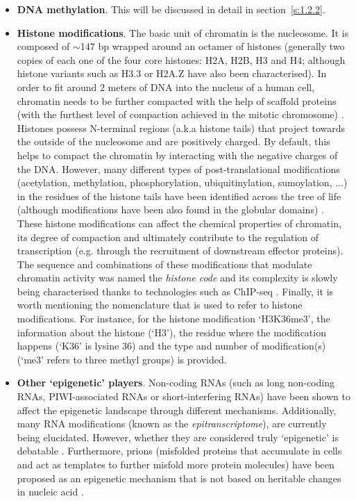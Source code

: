 \begin{itemize}
	
	\item \textbf{DNA methylation}. This will be discussed in detail in section~\ref{s:1.2.2}.
	
	\item \textbf{Histone modifications}. The basic unit of chromatin is the nucleosome. It is composed of $\sim$147 \acrshort{bp} wrapped around an octamer of histones (generally two copies of each one of the four core histones: H2A, H2B, H3 and H4; although histone variants such as H3.3 or H2A.Z have also been characterised). In order to fit around 2 meters of DNA into the nucleus of a human cell, chromatin needs to be further compacted with the help of scaffold proteins (with the furthest level of compaction achieved in the mitotic chromosome) \cite{Ou2017}. Histones possess N-terminal regions (a.k.a histone tails) that project towards the outside of the nucleosome and are positively charged. By default, this helps to compact the chromatin by interacting with the negative charges of the DNA. However, many different types of post-translational modifications (acetylation, methylation, phosphorylation, ubiquitinylation, sumoylation, ...) in the residues of the histone tails have been identified across the tree of life (although modifications have been also found in the globular domains) \cite{Lawrence2016}. These histone modifications can affect the chemical properties of chromatin, its degree of compaction and ultimately contribute to the regulation of transcription (e.g. through the recruitment of downstream effector proteins). The sequence and combinations of these modifications that modulate chromatin activity was named the \textit{histone code} \cite{Strahl2000} and its complexity is slowly being characterised thanks to technologies such as \acrshort{ChIP-seq} \cite{Consortium2012, Consortium2015}. Finally, it is worth mentioning the nomenclature that is used to refer to histone modifications. For instance, for the histone modification `H3K36me3', the information about the histone (`H3'), the residue where the modification happens (`K36' is lysine 36) and the type and number of modification(s) (`me3' refers to three methyl groups) is provided.

	\item \textbf{Other `epigenetic' players}. Non-coding RNAs (such as long non-coding RNAs, PIWI-associated RNAs or short-interfering RNAs) have been shown to affect the epigenetic landscape through different mechanisms. Additionally, many RNA modifications (known as the \textit{epitranscriptome}), are currently being elucidated. However, whether they are considered truly `epigenetic' is debatable \cite{Mattick2009,Morris2014}. Furthermore, prions (misfolded proteins that accumulate in cells and act as templates to further misfold more protein molecules) have been proposed as an epigenetic mechanism that is not based on heritable changes in nucleic acid \cite{Halfmann2010}.
	
	
\end{itemize}

